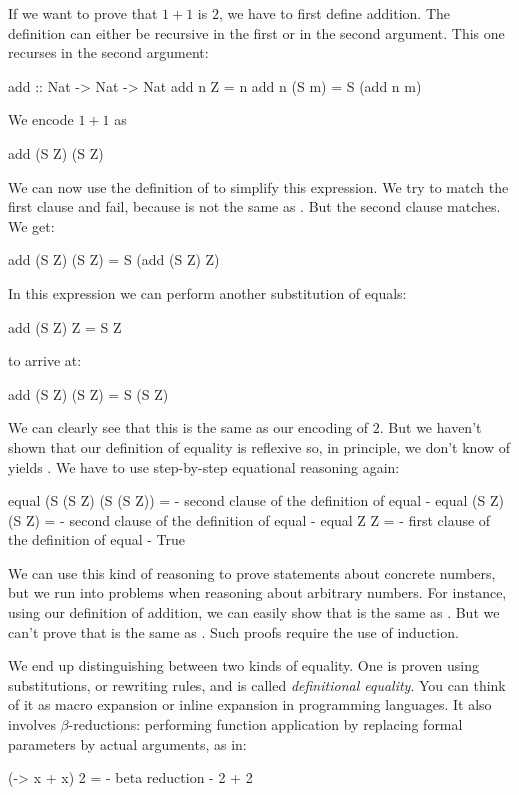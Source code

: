 \documentclass[DaoFP]{subfiles}
\begin{document}
If we want to prove that $1+1$ is $2$, we have to first define addition. The definition can either be recursive in the first or in the second argument. This one recurses in the second argument:
\begin{haskell}
add :: Nat -> Nat -> Nat
add n Z = n
add n (S m) = S (add n m)
\end{haskell}
We encode $1 + 1$ as 
\begin{haskell}
add (S Z) (S Z)
\end{haskell}
We can now use the definition of  to simplify this expression. We try to match the first clause and fail, because  is not the same as . But the second clause matches. We get:
\begin{haskell}
add (S Z) (S Z) = S (add (S Z) Z)
\end{haskell}
In this expression we can perform another substitution of equals:
\begin{haskell}
add (S Z) Z = S Z
\end{haskell}
to arrive at:
\begin{haskell}
add (S Z) (S Z) = S (S Z)
\end{haskell}
We can clearly see that this is the same as our encoding of $2$. But we haven't shown that our definition of equality is reflexive so, in principle, we don't know of  yields . We have to use step-by-step equational reasoning again:
\begin{haskell}
equal (S (S Z) (S (S Z)) =
{- second clause of the definition of equal -}
equal (S Z) (S Z) =
{- second clause of the definition of equal -}
equal Z Z =
{- first clause of the definition of equal -}
True
\end{haskell}

We can use this kind of reasoning to prove statements about concrete numbers, but we run into problems when reasoning about arbitrary numbers. For instance, using our definition of addition, we can easily show that  is the same as . But we can't prove that  is the same as . Such proofs require the use of induction. 

We end up distinguishing between two kinds of equality. One is proven using substitutions, or rewriting rules, and is called \emph{definitional equality}. You can think of it as macro expansion or inline expansion in programming languages. It also involves $\beta$-reductions: performing function application by replacing formal parameters by actual arguments, as in:
\begin{haskell}
(\x -> x + x) 2 =
{- beta reduction -}
2 + 2
\end{haskell}
\end{document}
